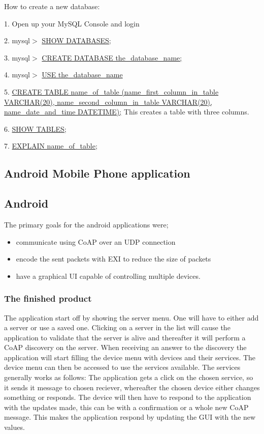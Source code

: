 How to create a new database:

1. 	Open up your MySQL Console and login

2. 	mysql$>$ \url{SHOW DATABASES;}

3. 	mysql$>$ \url{CREATE DATABASE the_database_name;}

4. 	mysql$>$ \url{USE the_database_name}

5. 	\url{CREATE TABLE name_of_table (name_first_column_in_table VARCHAR(20), name_second_column_in_table VARCHAR(20), name_date_and_time DATETIME);}
	This creates a table with three columns.
	
6. 	\url{SHOW TABLES;}

7. 	\url{EXPLAIN name_of_table;}

\subsection{Android Mobile Phone application}

\subsection{Android}

The primary goals for the android applications were;
\begin{itemize}
 \item communicate using CoAP over an UDP connection
 \item encode the sent packets with EXI to reduce the size of packets
 \item have a graphical UI capable of controlling multiple devices.
\end{itemize}

\subsubsection{The finished product}

The application start off by showing the server menu. One will have to either add a server or use a saved one. 
Clicking on a server in the list will cause the application to validate that the server is alive and thereafter it will perform a CoAP discovery on the server. 
When receiving an answer to the discovery the application will start filling the device menu with devices and their services. The device menu can then be accessed to use the services available.
The services generally works as follows: The application gets a click on the chosen service, so it sends it message to chosen reciever, whereafter the chosen device either changes something or responds.
The device will then have to respond to the application with the updates made, this can be with a confirmation or a whole new CoAP message. This makes the application respond by updating the GUI with the new values.

